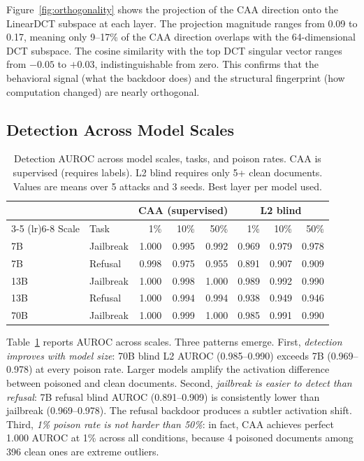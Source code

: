 \documentclass[11pt,a4paper]{article}
\begin{document}
Figure~\ref{fig:orthogonality} shows the projection of the CAA direction onto the LinearDCT subspace at each layer. The projection magnitude ranges from 0.09 to 0.17, meaning only 9--17\% of the CAA direction overlaps with the 64-dimensional DCT subspace. The cosine similarity with the top DCT singular vector ranges from $-0.05$ to $+0.03$, indistinguishable from zero. This confirms that the behavioral signal (what the backdoor does) and the structural fingerprint (how computation changed) are nearly orthogonal.

\subsection{Detection Across Model Scales}

\begin{table}[t]
\centering
\caption{Detection AUROC across model scales, tasks, and poison rates. CAA is supervised (requires labels). L2 blind requires only 5+ clean documents. Values are means over 5 attacks and 3 seeds. Best layer per model used.}
\label{tab:scales}
\small
\begin{tabular}{llrrrrrr}
\toprule
& & \multicolumn{3}{c}{CAA (supervised)} & \multicolumn{3}{c}{L2 blind} \\
\cmidrule(lr){3-5} \cmidrule(lr){6-8}
Scale & Task & 1\% & 10\% & 50\% & 1\% & 10\% & 50\% \\
\midrule
7B & Jailbreak & 1.000 & 0.995 & 0.992 & 0.969 & 0.979 & 0.978 \\
7B & Refusal & 0.998 & 0.975 & 0.955 & 0.891 & 0.907 & 0.909 \\
13B & Jailbreak & 1.000 & 0.998 & 1.000 & 0.989 & 0.992 & 0.990 \\
13B & Refusal & 1.000 & 0.994 & 0.994 & 0.938 & 0.949 & 0.946 \\
70B & Jailbreak & 1.000 & 0.999 & 1.000 & 0.985 & 0.991 & 0.990 \\
\bottomrule
\end{tabular}
\end{table}

Table~\ref{tab:scales} reports AUROC across scales. Three patterns emerge. First, \textit{detection improves with model size}: 70B blind L2 AUROC (0.985--0.990) exceeds 7B (0.969--0.978) at every poison rate. Larger models amplify the activation difference between poisoned and clean documents. Second, \textit{jailbreak is easier to detect than refusal}: 7B refusal blind AUROC (0.891--0.909) is consistently lower than jailbreak (0.969--0.978). The refusal backdoor produces a subtler activation shift. Third, \textit{1\% poison rate is not harder than 50\%}: in fact, CAA achieves perfect 1.000 AUROC at 1\% across all conditions, because 4 poisoned documents among 396 clean ones are extreme outliers.
\end{document}
